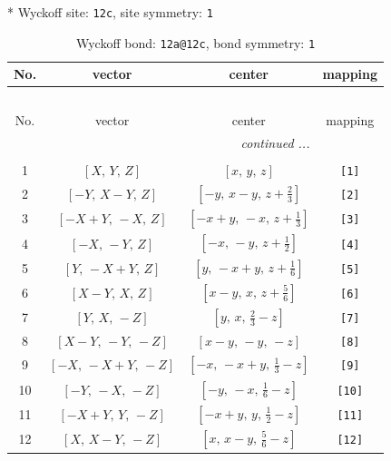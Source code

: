 \documentclass[fleqn,8pt]{jsarticle}
\begin{document}
* Wyckoff site: {\tt 12c}, site symmetry: {\tt 1}
\renewcommand{\arraystretch}{1.2}
\begin{longtable}{cccc}
\caption{Wyckoff bond: {\tt 12a@12c}, bond symmetry: {\tt 1}}
 \\
 \hline \hline
No. & vector & center & mapping \\ \hline \endfirsthead

\multicolumn{3}{l}{\tablename\ \thetable{}} \\
 \hline \hline
No. & vector & center & mapping \\ \hline \endhead

 \hline \hline
\multicolumn{3}{r}{\footnotesize\it continued ...} \\ \endfoot

 \hline \hline
\multicolumn{3}{r}{} \\ \endlastfoot

1 & $\left[ X,\, Y,\, Z \right]$ & $\left[ x,\, y,\, z \right]$ & {\tt [1]} \\ \hline
2 & $\left[ - Y,\, X - Y,\, Z \right]$ & $\left[ - y,\, x - y,\, z + \frac{2}{3} \right]$ & {\tt [2]} \\ \hline
3 & $\left[ - X + Y,\, - X,\, Z \right]$ & $\left[ - x + y,\, - x,\, z + \frac{1}{3} \right]$ & {\tt [3]} \\ \hline
4 & $\left[ - X,\, - Y,\, Z \right]$ & $\left[ - x,\, - y,\, z + \frac{1}{2} \right]$ & {\tt [4]} \\ \hline
5 & $\left[ Y,\, - X + Y,\, Z \right]$ & $\left[ y,\, - x + y,\, z + \frac{1}{6} \right]$ & {\tt [5]} \\ \hline
6 & $\left[ X - Y,\, X,\, Z \right]$ & $\left[ x - y,\, x,\, z + \frac{5}{6} \right]$ & {\tt [6]} \\ \hline
7 & $\left[ Y,\, X,\, - Z \right]$ & $\left[ y,\, x,\, \frac{2}{3} - z \right]$ & {\tt [7]} \\ \hline
8 & $\left[ X - Y,\, - Y,\, - Z \right]$ & $\left[ x - y,\, - y,\, - z \right]$ & {\tt [8]} \\ \hline
9 & $\left[ - X,\, - X + Y,\, - Z \right]$ & $\left[ - x,\, - x + y,\, \frac{1}{3} - z \right]$ & {\tt [9]} \\ \hline
10 & $\left[ - Y,\, - X,\, - Z \right]$ & $\left[ - y,\, - x,\, \frac{1}{6} - z \right]$ & {\tt [10]} \\ \hline
11 & $\left[ - X + Y,\, Y,\, - Z \right]$ & $\left[ - x + y,\, y,\, \frac{1}{2} - z \right]$ & {\tt [11]} \\ \hline
12 & $\left[ X,\, X - Y,\, - Z \right]$ & $\left[ x,\, x - y,\, \frac{5}{6} - z \right]$ & {\tt [12]} \\
\end{longtable}
\end{document}

